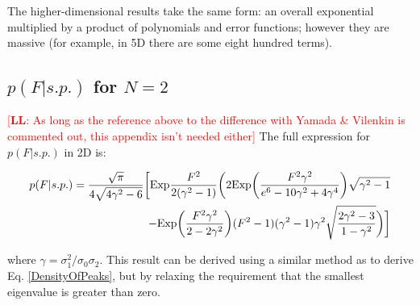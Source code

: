\documentclass[12pt]{article}
\newcommand{\lfl}[1]{\textcolor{red}{[{\bf LL}: #1]}}
\begin{document}
The higher-dimensional results take the same form: an overall exponential multiplied by a product of polynomials and error functions; however they are massive (for example, in 5D there are some eight hundred terms).

\subsection{$p(F|s.p.)$ for $N=2$}
\lfl{As long as the reference above to the difference with Yamada \& Vilenkin is commented out, this appendix isn't needed either}
The full expression for $p(F|s.p.)$ in 2D is:

\begin{equation}
\begin{split}
p(F|s.p.)=\frac{\sqrt{\pi}}{4\sqrt{4\gamma^2-6}}\bigg{[}\mathrm{Exp}\frac{F^2}{2(\gamma^2-1)}\bigg{(}2\mathrm{Exp}\bigg{(}\frac{F^2\gamma^2}{e^6-10\gamma^2+4\gamma^4}\bigg{)}\sqrt{\gamma^2-1}\\
-\mathrm{Exp}\bigg{(}\frac{F^2\gamma^2}{2-2\gamma^2}\bigg{)}(F^2-1)(\gamma^2-1)\gamma^2\sqrt{\frac{2\gamma^2-3}{1-\gamma^2}}\bigg{)}\bigg{]}
\end{split}
\end{equation}

\noindent where $\gamma = \sigma_1^2/\sigma_0\sigma_2$. This result can be derived using a similar method as to derive Eq. \ref{DensityOfPeaks}, but by relaxing the requirement that the smallest eigenvalue is greater than zero.
\end{document}
